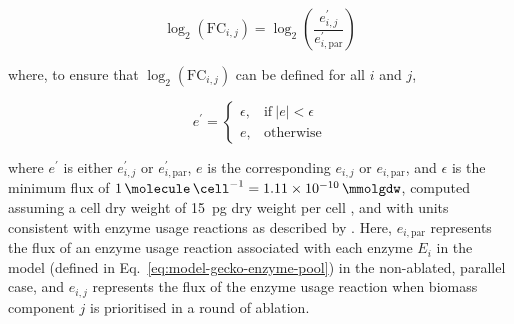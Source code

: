 \begin{equation}
  \log_{2}(\mathrm{FC}_{i,j}) = \log_{2}\left( \frac{e_{i,j}^{\prime}}{e_{i, \mathrm{par}}^{\prime}} \right)
  \label{eq:model-foldchange}
\end{equation}

where, to ensure that $\log_{2}(\mathrm{FC}_{i,j})$ can be defined for all $i$ and $j$,

\begin{equation}
  e^{\prime} =
  \begin{cases}
    \epsilon, & \text{if}\ |e|<\epsilon \\
    e, & \text{otherwise}
  \end{cases}
  \label{eq:model-epsilon-round}
\end{equation}

where $e^{\prime}$ is either $e_{i,j}^{\prime}$ or $e_{i, \mathrm{par}}^{\prime}$, $e$ is the corresponding $e_{i,j}$ or $e_{i, \mathrm{par}}$, and $\epsilon$ is the minimum flux of $\SI{1}{\molecule~\cell^{-1}} = \SI{1.11d-10}{\mmolgdw}$, computed assuming a cell dry weight of \SI{15}{\pico\gram} dry weight per cell \parencite{shermanGettingStartedYeast2002}, and with units consistent with enzyme usage reactions as described by \textcite{sanchezImprovingPhenotypePredictions2017}.
Here, $e_{i, \mathrm{par}}$ represents the flux of an enzyme usage reaction associated with each enzyme $E_{i}$ in the model (defined in Eq.\ \ref{eq:model-gecko-enzyme-pool}) in the non-ablated, parallel case, and $e_{i,j}$ represents the flux of the enzyme usage reaction when biomass component $j$ is prioritised in a round of ablation.



